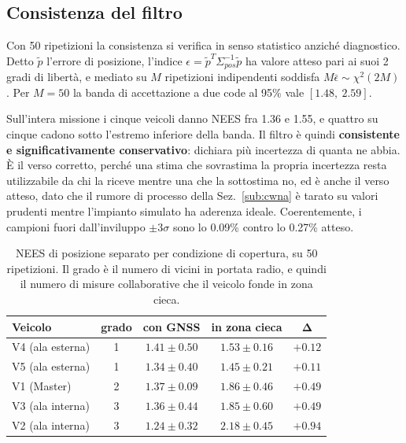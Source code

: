 \documentclass[conference,9pt]{IEEEtran}
\begin{document}
\subsection{Consistenza del filtro}

Con 50 ripetizioni la consistenza si verifica in senso statistico anzich\'e
diagnostico. Detto $\tilde p$ l'errore di posizione, l'indice
$\epsilon = \tilde p^T \Sigma_{pos}^{-1} \tilde p$ ha valore atteso pari ai suoi
2 gradi di libert\`a, e mediato su $M$ ripetizioni indipendenti soddisfa
$M\bar\epsilon \sim \chi^2(2M)$. Per $M = 50$ la banda di accettazione a due
code al 95\% vale $[1.48,\ 2.59]$.

Sull'intera missione i cinque veicoli danno NEES fra 1.36 e 1.55, e quattro su
cinque cadono sotto l'estremo inferiore della banda. Il filtro \`e quindi
\textbf{consistente e significativamente conservativo}: dichiara pi\`u
incertezza di quanta ne abbia. \`E il verso corretto, perch\'e una stima che
sovrastima la propria incertezza resta utilizzabile da chi la riceve mentre una
che la sottostima no, ed \`e anche il verso atteso, dato che il rumore di
processo della Sez.~\ref{sub:cwna} \`e tarato su valori prudenti mentre
l'impianto simulato ha aderenza ideale. Coerentemente, i campioni fuori
dall'inviluppo $\pm 3\sigma$ sono lo 0.09\% contro lo 0.27\% atteso.

\begin{table}[t]
\centering
\caption{NEES di posizione separato per condizione di copertura, su 50
ripetizioni. Il grado \`e il numero di vicini in portata radio, e quindi il
numero di misure collaborative che il veicolo fonde in zona cieca.}
\label{tab:nees}
\begin{tabular}{lcccc}
\toprule
\textbf{Veicolo} & \textbf{grado} & \textbf{con GNSS} & \textbf{in zona cieca} &
$\mathbf{\Delta}$\\
\midrule
V4 (ala esterna) & 1 & $1.41 \pm 0.50$ & $1.53 \pm 0.16$ & $+0.12$\\
V5 (ala esterna) & 1 & $1.34 \pm 0.40$ & $1.45 \pm 0.21$ & $+0.11$\\
V1 (Master)      & 2 & $1.37 \pm 0.09$ & $1.86 \pm 0.46$ & $+0.49$\\
V3 (ala interna) & 3 & $1.36 \pm 0.44$ & $1.85 \pm 0.60$ & $+0.49$\\
V2 (ala interna) & 3 & $1.24 \pm 0.32$ & $\mathbf{2.18 \pm 0.45}$ & $\mathbf{+0.94}$\\
\bottomrule
\end{tabular}
\end{table}
\end{document}
